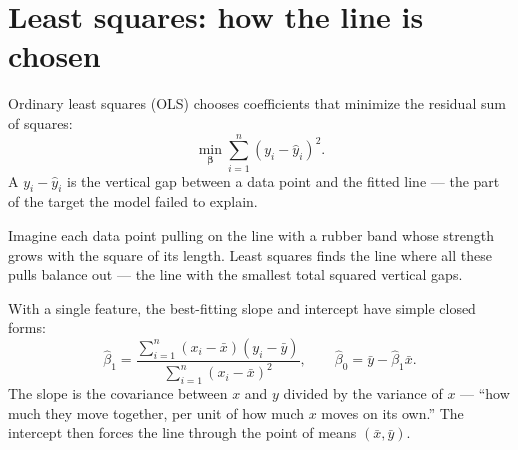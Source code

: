 \section{Least squares: how the line is chosen}

Ordinary least squares (OLS) chooses coefficients that minimize the residual sum of squares:
\[
  \min_{\bm{\beta}}
  \sum_{i=1}^{n}{(y_i-\hat{y}_i)}^2.
\]
A  $y_i-\hat{y}_i$ is the vertical gap between a data point and the fitted line --- the part of the target the model failed to explain.

\begin{mlfigure}
\end{mlfigure}

\begin{intuition}
Imagine each data point pulling on the line with a rubber band whose strength grows with the square of its length. Least squares finds the line where all these pulls balance out --- the line with the smallest total squared vertical gaps.
\end{intuition}

With a single feature, the best-fitting slope and intercept have simple closed forms:
\[
  \hat{\beta}_1
  =\frac{\sum_{i=1}^{n}(x_i-\bar{x})(y_i-\bar{y})}
        {\sum_{i=1}^{n}{(x_i-\bar{x})}^2},
  \qquad
  \hat{\beta}_0=\bar{y}-\hat{\beta}_1\bar{x}.
\]
The slope is the covariance between $x$ and $y$ divided by the variance of $x$ --- ``how much they move together, per unit of how much $x$ moves on its own.'' The intercept then forces the line through the point of means $(\bar{x},\bar{y})$.

